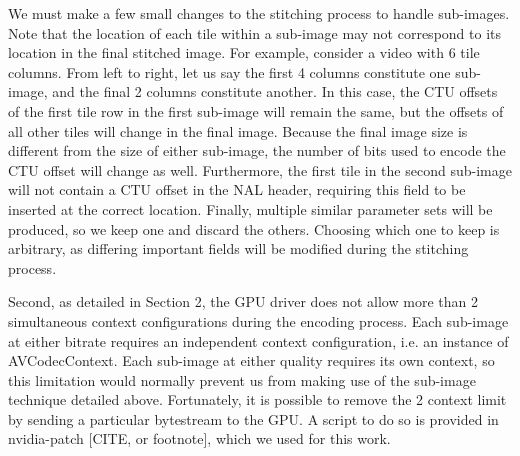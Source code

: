 We must make a few small changes to the stitching process to handle sub-images. Note that the location of each tile within a sub-image may not correspond to its location in the final stitched image. For example, consider a video with 6 tile columns. From left to right, let us say the first 4 columns constitute one sub-image, and the final 2 columns constitute another. In this case, the CTU offsets of the first tile row in the first sub-image will remain the same, but the offsets of all other tiles will change in the final image. Because the final image size is different from the size of either sub-image, the number of bits used to encode the CTU offset will change as well. Furthermore, the first tile in the second sub-image will not contain a CTU offset in the NAL header, requiring this field to be inserted at the correct location. Finally, multiple similar parameter sets will be produced, so we keep one and discard the others. Choosing which one to keep is arbitrary, as differing important fields will be modified during the stitching process.

Second, as detailed in Section 2, the GPU driver does not allow more than 2 simultaneous context configurations during the encoding process. Each sub-image at either bitrate requires an independent context configuration, i.e. an instance of AVCodecContext. Each sub-image at either quality requires its own context, so this limitation would normally prevent us from making use of the sub-image technique detailed above. Fortunately, it is possible to remove the 2 context limit by sending a particular bytestream to the GPU. A script to do so is provided in nvidia-patch [CITE, or footnote], which we used for this work.

